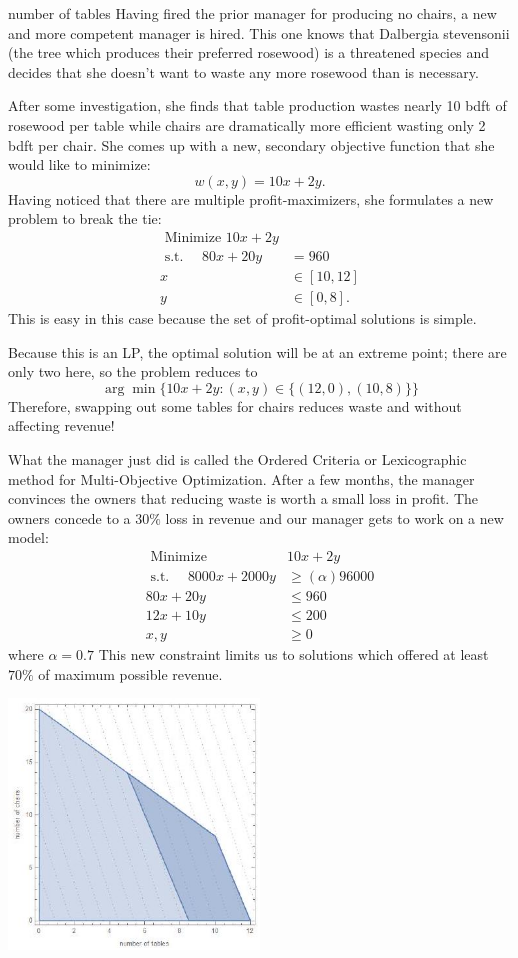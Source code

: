 number of tables Having fired the prior manager for producing no chairs, a new and more competent manager is hired. This one knows that Dalbergia stevensonii (the tree which produces their preferred rosewood) is a threatened species and decides that she doesn't want to waste any more rosewood than is necessary.

After some investigation, she finds that table production wastes nearly 10 bdft of rosewood per table while chairs are dramatically more efficient wasting only 2 bdft per chair. She comes up with a new, secondary objective function that she would like to minimize:
$$
w(x, y)=10 x+2 y .
$$
Having noticed that there are multiple profit-maximizers, she formulates a new problem to break the tie:
$$
\begin{aligned}
\text { Minimize } 10 x+2 y & \\
\text { s.t. } \quad 80 x+20 y &=960 \\
x & \in[10,12] \\
y & \in[0,8] .
\end{aligned}
$$
This is easy in this case because the set of profit-optimal solutions is simple.

Because this is an LP, the optimal solution will be at an extreme point; there are only two here, so the problem reduces to
$$
\arg \min \{10 x+2 y:(x, y) \in\{(12,0),(10,8)\}\}
$$
Therefore, swapping out some tables for chairs reduces waste and without affecting revenue!

What the manager just did is called the Ordered Criteria or Lexicographic method for Multi-Objective Optimization. After a few months, the manager convinces the owners that reducing waste is worth a small loss in profit. The owners concede to a $30 \%$ loss in revenue and our manager gets to work on a new model:
$$
\begin{aligned}
\text { Minimize } & 10 x+2 y \\
\text { s.t. } \quad 8000 x+2000 y & \geq(\alpha) 96000 \\
80 x+20 y & \leq 960 \\
12 x+10 y & \leq 200 \\
x, y & \geq 0
\end{aligned}
$$
where $\alpha=0.7$ This new constraint limits us to solutions which offered at least $70 \%$ of maximum possible revenue.

\includegraphics[width=0.5\textwidth]{optimization/multi-objective/images/2022_02_28_634e8079070800ac7e3cg-10}

